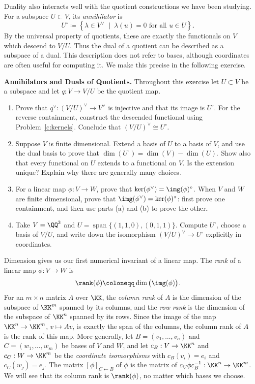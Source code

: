 \documentclass[12pt,reqno]{amsart}
\begin{document}
\hrulefill

Duality also interacts well with the quotient constructions we have been studying. For a subspace $U\subset V$, its \emph{annihilator} is
\[
U^\circ\coloneqq\left\{\lambda\in V^{\vee} \;\; \big| \;\; \lambda(u)=0 \text{ for all } u\in U\right\}.
\]
By the universal property of quotients, these are exactly the functionals on $V$ which descend to $V/U$. Thus the dual of a quotient can be described as a subspace of a dual. This description does not refer to bases, although coordinates are often useful for computing it. We make this precise in the following exercise.

\hrulefill

\begin{problems}
\item\label{c:annihilators} \textbf{Annihilators and Duals of Quotients.} Throughout this exercise let $U\subset V$ be a subspace and let $q:V\to V/U$ be the quotient map.
\begin{enumerate}
\item Prove that $q^{\vee}:(V/U)^{\vee}\to V^{\vee}$ is injective and that its image is $U^\circ$. For the reverse containment, construct the descended functional using Problem~\ref{c:kernels}. Conclude that $(V/U)^{\vee}\cong U^\circ$.
\item Suppose $V$ is finite dimensional. Extend a basis of $U$ to a basis of $V$, and use the dual basis to prove that $\dim(U^\circ)=\dim(V)-\dim(U)$. Show also that every functional on $U$ extends to a functional on $V$. Is the extension unique? Explain why there are generally many choices.
\item For a linear map $\phi:V\to W$, prove that $\ker(\phi^{\vee})=\img(\phi)^\circ$. When $V$ and $W$ are finite dimensional, prove that $\img(\phi^{\vee})=\ker(\phi)^\circ$: first prove one containment, and then use parts (a) and (b) to prove the other.
\item Take $V=\QQ^3$ and $U=\operatorname{span}\{(1,1,0),(0,1,1)\}$. Compute $U^\circ$, choose a basis of $V/U$, and write down the isomorphism $(V/U)^{\vee}\to U^\circ$ explicitly in coordinates.
\end{enumerate}
\end{problems}

\hrulefill

Dimension gives us our first numerical invariant of a linear map. The \emph{rank} of a linear map $\phi:V\to W$ is
\[
\rank(\phi)\coloneqq\dim\big(\img(\phi)\big).
\]
For an $m\times n$ matrix $A$ over $\KK$, the \emph{column rank} of $A$ is the dimension of the subspace of $\KK^m$ spanned by its columns, and the \emph{row rank} is the dimension of the subspace of $\KK^n$ spanned by its rows. Since the image of the map $\KK^n\to\KK^m$, $v\mapsto Av$, is exactly the span of the columns, the column rank of $A$ is the rank of this map. More generally, let $B=(v_1,\ldots,v_n)$ and $C=(w_1,\ldots,w_m)$ be bases of $V$ and $W$, and let $c_B:V\to\KK^n$ and $c_C:W\to\KK^m$ be the \emph{coordinate isomorphisms} with $c_B(v_i)=e_i$ and $c_C(w_j)=e_j$. The matrix $[\phi]_{C\leftarrow B}$ of $\phi$ is the matrix of $c_C\phi c_B^{-1}:\KK^n\to\KK^m$. We will see that its column rank is $\rank(\phi)$, no matter which bases we choose.
\end{document}
